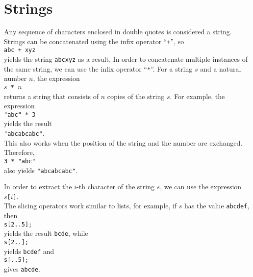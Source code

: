 \section{Strings}
Any sequence of characters enclosed in double quotes is considered a string.
Strings can be concatenated using the infix operator ``\texttt{+}'', so
\\[0.2cm]
\hspace*{1.3cm}
\texttt{abc + xyz}
\\[0.2cm]
yields the string \texttt{abcxyz} as a result.
In order to concatenate multiple instances of the same string, we can use the infix
operator ``\texttt{*}''.  For a string $s$ and a natural number $n$, the expression
\\[0.2cm]
\hspace*{1.3cm}
\texttt{$s$ * $n$}
\\[0.2cm]
returns a string that consists of $n$ copies of the string $s$.  For example, the
expression 
\\[0.2cm]
\hspace*{1.3cm}
\texttt{"abc" * 3}
\\[0.2cm]
yields the result
\\[0.2cm]
\hspace*{1.3cm}
\texttt{"abcabcabc"}.
\\[0.2cm]
This also works when the position of the string and the number are exchanged.  Therefore,
\\[0.2cm]
\hspace*{1.3cm}
\texttt{3 * "abc"}
\\[0.2cm]
also yields \texttt{"abcabcabc"}.


In order to extract the $i$-th character of the string $s$, we can use the expression
\\[0.2cm]
\hspace*{1.3cm}
\texttt{$s$[$i$]}.
\\[0.2cm]
The slicing operators work similar to lists, for example, if $s$ has the value 
\texttt{abcdef}, then 
\\[0.2cm]
\hspace*{1.3cm}
\texttt{s[2..5];}
\\[0.2cm]
yields the result \texttt{bcde}, while 
\\[0.2cm]
\hspace*{1.3cm}
\texttt{s[2..];}
\\[0.2cm]
yields \texttt{bcdef} and 
\\[0.2cm]
\hspace*{1.3cm}
\texttt{s[..5];}
\\[0.2cm]
gives \texttt{abcde}.  

